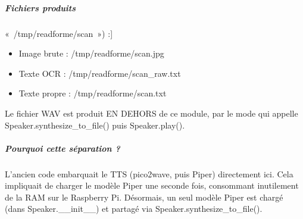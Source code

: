 \documentclass[letterpaper,10pt,french]{sphinxmanual}
\begin{document}
\subparagraph{Fichiers produits}
\label{\detokenize{api/hardware.devices:fichiers-produits}}\begin{description}
\sphinxlineitem{Pour un basename donné (ex}{[}« /tmp/readforme/scan ») :{]}\begin{itemize}
\item {} 
\sphinxAtStartPar
Image brute  : /tmp/readforme/scan.jpg

\item {} 
\sphinxAtStartPar
Texte OCR    : /tmp/readforme/scan\_raw.txt

\item {} 
\sphinxAtStartPar
Texte propre : /tmp/readforme/scan.txt

\end{itemize}

\end{description}

\sphinxAtStartPar
Le fichier WAV est produit EN DEHORS de ce module, par le mode qui
appelle Speaker.synthesize\_to\_file() puis Speaker.play().


\subparagraph{Pourquoi cette séparation ?}
\label{\detokenize{api/hardware.devices:pourquoi-cette-separation}}
\sphinxAtStartPar
L’ancien code embarquait le TTS (pico2wave, puis Piper) directement ici.
Cela impliquait de charger le modèle Piper une seconde fois, consommant
inutilement de la RAM sur le Raspberry Pi.
Désormais, un seul modèle Piper est chargé (dans Speaker.\_\_init\_\_) et
partagé via Speaker.synthesize\_to\_file().
\end{document}

